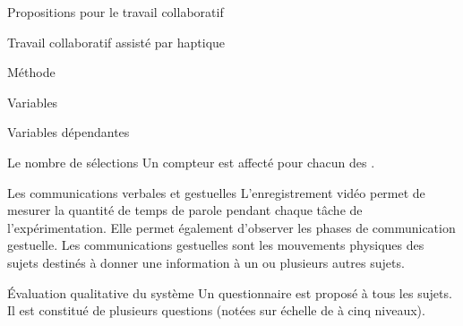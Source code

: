 \documentclass[myfrancais]{mythesis}
\begin{document}
\begin{mypart}{Propositions pour le travail collaboratif}
\begin{mychapter}{Travail collaboratif assisté par haptique}
\begin{mysection}{Méthode}
\begin{mysubsection}{Variables}
\begin{mysubsubsection}{Variables dépendantes}
\begin{myparagraph}{ Le nombre de sélections}
							Un compteur est affecté pour chacun des .
						\end{myparagraph}
						\begin{myparagraph}{ Les communications verbales et gestuelles}
							L'enregistrement vidéo permet de mesurer la quantité de temps de parole pendant chaque tâche de l'expérimentation.
							Elle permet également d'observer les phases de communication gestuelle.
							Les communications gestuelles sont les mouvements physiques des sujets destinés à donner une information à un ou plusieurs autres sujets.
						\end{myparagraph}
						\begin{myparagraph}{ Évaluation qualitative du système}
							Un questionnaire est proposé à tous les sujets.
							Il est constitué de plusieurs questions (notées sur échelle de  à cinq niveaux).


\end{myparagraph}
\end{mysubsubsection}
\end{mysubsection}
\end{mysection}
\end{mychapter}
\end{mypart}
\end{document}
